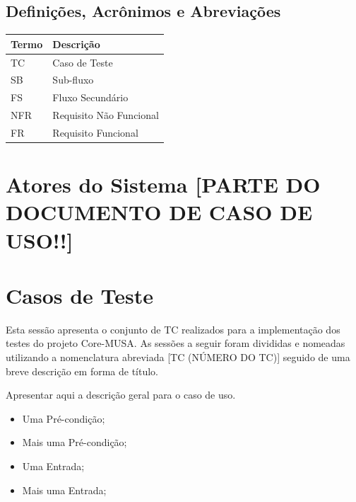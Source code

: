 \documentclass{article}
\begin{document}
  \subsection{Definições, Acrônimos e Abreviações}
  \FloatBarrier
    \begin{table}[H] 
      \begin{center}
        \begin{tabular}[pos]{|m{2cm} | m{8cm}|} 
          \hline 
          \cellcolor[gray]{0.9}\textbf{Termo} & \cellcolor[gray]{0.9}\textbf{Descrição} \\ \hline
          TC & Caso de Teste  \\ \hline
          SB & Sub-fluxo \\ \hline
          FS & Fluxo Secundário \\ \hline
          NFR & Requisito Não Funcional \\ \hline
          FR & Requisito Funcional \\
          \hline
        \end{tabular}
      \end{center}
    \label{tab:definicoes}
    \end{table}

  \section{Atores do Sistema [PARTE DO DOCUMENTO DE CASO DE USO!!]}
  
  \section{Casos de Teste}
  Esta sessão apresenta o conjunto de TC realizados para a implementação dos testes do projeto Core-MUSA. As sessões a seguir foram divididas e nomeadas utilizando a nomenclatura abreviada [TC (NÚMERO DO TC)] seguido de uma breve descrição em forma de título.

  Apresentar aqui a descrição geral para o caso de uso.
  
  \preconditions 
    \begin{itemize}
     \item Uma Pré-condição;
     \item Mais uma Pré-condição;
    \end{itemize}
    
  	\begin{itemize}
     \item Uma Entrada;
     \item Mais uma Entrada;
    \end{itemize}
    
\end{document}
